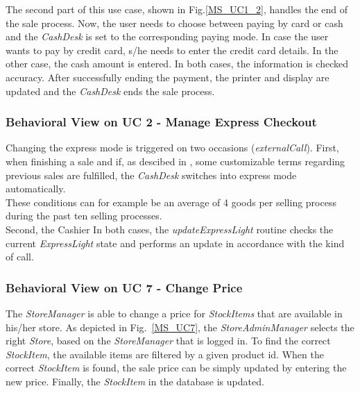 		The second part of this use case, shown in Fig.\added{~}\ref{MS_UC1_2}, handles the end of the sale process. 
		Now, the user needs to choose between paying by card or cash and the \textit{CashDesk} is set to the corresponding paying mode. 
		In case the user wants to pay by credit card, s/he needs to enter the credit card details. 
		In the other case, the cash amount is entered. 
		In both cases, the information is checked  accuracy.
		After successfully ending the payment, the printer and display are updated and the \textit{CashDesk} ends the sale process.

		\subsubsection*{Behavioral View on UC 2 - Manage Express Checkout}
		Changing the express mode is triggered on two occasions (\textit{externalCall}). 
		First, when finishing a sale and if, as descibed in \cite{herold2008}, some customizable terms regarding previous sales are fulfilled, the \textit{CashDesk} switches into express mode automatically.\\ These conditions can for example be an average of 4 goods per selling process during the past ten selling processes.\\
		Second, the Cashier 
		In both cases, the \textit{updateExpressLight} routine checks the current \textit{ExpressLight} state and performs an update in accordance with the kind of call.
		
		\subsubsection*{Behavioral View on UC 7 - Change Price}
		The \textit{StoreManager} is able to change a price for \textit{StockItems} that are available in his/her store. 
		As depicted in Fig.~\ref{MS_UC7}, the \textit{StoreAdminManager} selects the right \textit{Store}, based on the \textit{StoreManager} that is logged in. 
		To find the correct \textit{StockItem}, the available items are filtered by a given product id. 
		When the correct \textit{StockItem} is found, the sale price can be simply updated by entering the new price. 
		Finally, the \textit{StockItem} in the database is updated.
		
